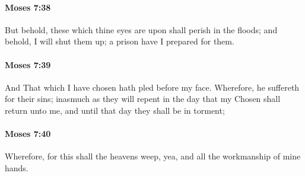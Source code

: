 		\paragraph{Moses 7:38} %
			\label{MOSES-7-38}

			But behold, these which thine eyes are upon shall perish in the floods; and behold, I will shut them up; a prison have I prepared for them.


		\paragraph{Moses 7:39} %
			\label{MOSES-7-39}

			And That which I have chosen hath pled before my face. Wherefore, he suffereth for their sins; inasmuch as they will repent in the day that my Chosen shall return unto me, and until that day they shall be in torment;


		\paragraph{Moses 7:40} %
			\label{MOSES-7-40}

			Wherefore, for this shall the heavens weep, yea, and all the workmanship of mine hands.


